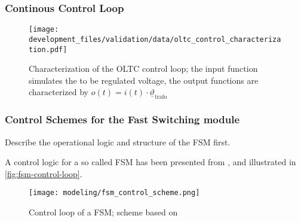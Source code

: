 
% 

\subsubsection{Continous Control Loop}

\begin{figure}[htb!]
        \centering
        \texttt{[image: development\_files/validation/data/oltc\_control\_characterization.pdf]}
        \caption[Characterization of the OLTC control loops]{Characterization of the OLTC control loop; the input function simulates the to be regulated voltage, the output functions are characterized by $o(t)=i(t) \cdot \underline{\vartheta}_\mathrm{trafo}$}
        \label{fig:oltc-control-characterization}
\end{figure}

\subsubsection{Control Schemes for the Fast Switching module}
Describe the operational logic and structure of the \acf{FSM} first.

A control logic for a so called \acs{FSM} has been presented from \textcite{burlakinEnhancedVoltageControl2024}, and illustrated in \autoref{fig:fsm-control-loop}.

\begin{figure}[htb!]
        \centering
        \texttt{[image: modeling/fsm\_control\_scheme.png]}
        \caption[Control loop of a \acf{FSM}]{Control loop of a \acs{FSM}; scheme based on \textcite{burlakinEnhancedVoltageControl2024}}
        \label{fig:fsm-control-loop}
\end{figure}

